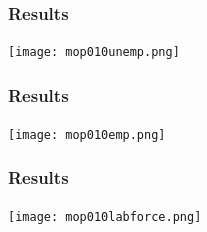 \begin{frame}

    \label{unemp_result}
    \frametitle{Results} %
    \framesubtitle{}  %
    \rmfamily %
    
    \begin{center}
        \texttt{[image: mop010unemp.png]}
    \end{center}

    \hyperlink{perc_comparison_2}{}
    \hyperlink{dist_2}{}

\end{frame}

\begin{frame}

    \label{emp_result}
    \frametitle{Results} %
    \framesubtitle{}  %
    \rmfamily %
    
    \begin{center}
        \texttt{[image: mop010emp.png]}
    \end{center}

    \hyperlink{perc_comparison_3}{}
    \hyperlink{dist_3}{}

\end{frame}


\begin{frame}

    \label{labforce_result}
    \frametitle{Results} %
    \framesubtitle{}  %
    \rmfamily %
    
    \begin{center}
        \texttt{[image: mop010labforce.png]}
    \end{center}

    \hyperlink{perc_comparison_4}{}
    \hyperlink{dist_4}{}

\end{frame}


